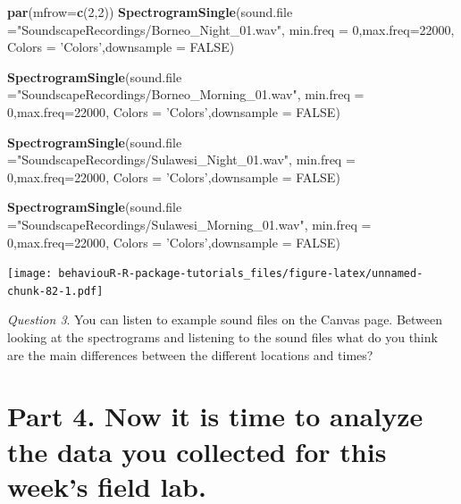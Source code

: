 \documentclass[]{book}
\newenvironment{Shaded}{\begin{snugshade}}{\end{snugshade}}
\newcommand{\DataTypeTok}[1]{\textcolor[rgb]{0.13,0.29,0.53}{#1}}
\newcommand{\DecValTok}[1]{\textcolor[rgb]{0.00,0.00,0.81}{#1}}
\newcommand{\KeywordTok}[1]{\textcolor[rgb]{0.13,0.29,0.53}{\textbf{#1}}}
\newcommand{\NormalTok}[1]{#1}
\newcommand{\OtherTok}[1]{\textcolor[rgb]{0.56,0.35,0.01}{#1}}
\newcommand{\StringTok}[1]{\textcolor[rgb]{0.31,0.60,0.02}{#1}}
\begin{document}
\begin{Shaded}
\begin{Highlighting}[]
\KeywordTok{par}\NormalTok{(}\DataTypeTok{mfrow=}\KeywordTok{c}\NormalTok{(}\DecValTok{2}\NormalTok{,}\DecValTok{2}\NormalTok{))}
\KeywordTok{SpectrogramSingle}\NormalTok{(}\DataTypeTok{sound.file =}\StringTok{"SoundscapeRecordings/Borneo_Night_01.wav"}\NormalTok{,}
                  \DataTypeTok{min.freq =} \DecValTok{0}\NormalTok{,}\DataTypeTok{max.freq=}\DecValTok{22000}\NormalTok{,}
                  \DataTypeTok{Colors =} \StringTok{'Colors'}\NormalTok{,}\DataTypeTok{downsample =} \OtherTok{FALSE}\NormalTok{)}

\KeywordTok{SpectrogramSingle}\NormalTok{(}\DataTypeTok{sound.file =}\StringTok{"SoundscapeRecordings/Borneo_Morning_01.wav"}\NormalTok{,}
                  \DataTypeTok{min.freq =} \DecValTok{0}\NormalTok{,}\DataTypeTok{max.freq=}\DecValTok{22000}\NormalTok{,}
                  \DataTypeTok{Colors =} \StringTok{'Colors'}\NormalTok{,}\DataTypeTok{downsample =} \OtherTok{FALSE}\NormalTok{)}

\KeywordTok{SpectrogramSingle}\NormalTok{(}\DataTypeTok{sound.file =}\StringTok{"SoundscapeRecordings/Sulawesi_Night_01.wav"}\NormalTok{,}
                  \DataTypeTok{min.freq =} \DecValTok{0}\NormalTok{,}\DataTypeTok{max.freq=}\DecValTok{22000}\NormalTok{,}
                  \DataTypeTok{Colors =} \StringTok{'Colors'}\NormalTok{,}\DataTypeTok{downsample =} \OtherTok{FALSE}\NormalTok{)}

\KeywordTok{SpectrogramSingle}\NormalTok{(}\DataTypeTok{sound.file =}\StringTok{"SoundscapeRecordings/Sulawesi_Morning_01.wav"}\NormalTok{,}
                  \DataTypeTok{min.freq =} \DecValTok{0}\NormalTok{,}\DataTypeTok{max.freq=}\DecValTok{22000}\NormalTok{,}
                  \DataTypeTok{Colors =} \StringTok{'Colors'}\NormalTok{,}\DataTypeTok{downsample =} \OtherTok{FALSE}\NormalTok{)}
\end{Highlighting}
\end{Shaded}

\texttt{[image: behaviouR-R-package-tutorials\_files/figure-latex/unnamed-chunk-82-1.pdf]}

\emph{Question 3}. You can listen to example sound files on the Canvas page. Between looking at the spectrograms and listening to the sound files what do you think are the main differences between the different locations and times?

\hypertarget{part-4.-now-it-is-time-to-analyze-the-data-you-collected-for-this-weeks-field-lab.}{%
\section*{Part 4. Now it is time to analyze the data you collected for this week's field lab.}\label{part-4.-now-it-is-time-to-analyze-the-data-you-collected-for-this-weeks-field-lab.}}
\end{document}
